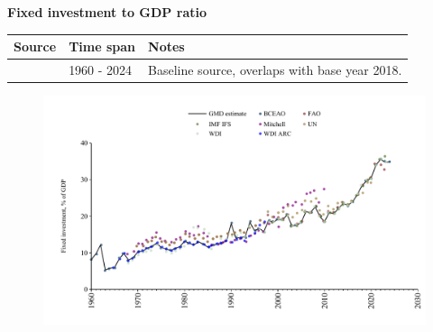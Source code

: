\documentclass[12pt,a4paper,landscape]{article}
\begin{document}
\begin{adjustbox}{max totalsize={\paperwidth}{\paperheight},center}
\begin{minipage}[t][\textheight][t]{\textwidth}
\vspace*{0.5cm}
{}
\begin{center}
{\Large\bfseries Fixed investment to GDP ratio}
\end{center}
\vspace{0.5cm}
\begin{table}[H]
\centering
\small
\begin{tabular}{|l|l|l|}
\hline
\textbf{Source} & \textbf{Time span} & \textbf{Notes} \\
\hline
\rowcolor{white}\cite{BCEAO}& 1960 - 2024 &Baseline source, overlaps with base year 2018. \\
\hline
\end{tabular}
\end{table}
\begin{figure}[H]
\centering
\includegraphics[width=\textwidth,height=0.6\textheight,keepaspectratio]{graphs/SEN_finv_GDP.pdf}
\end{figure}
\end{minipage}
\end{adjustbox}
\end{document}
